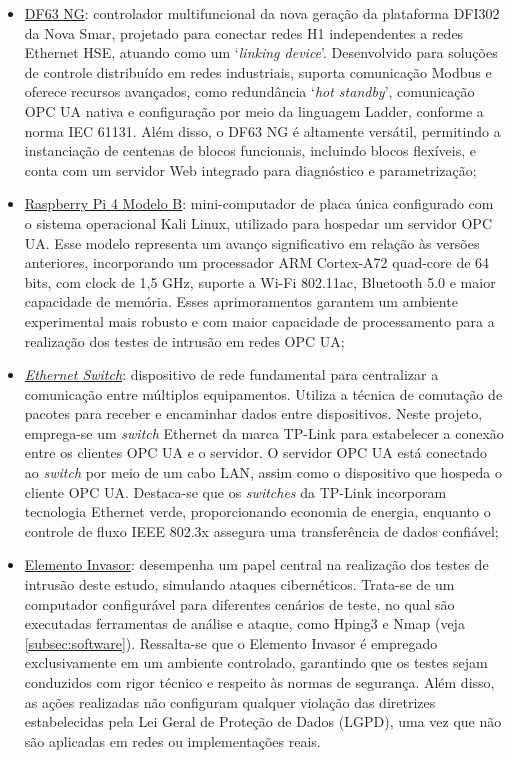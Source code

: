         \begin{itemize}
            \item \underline{DF63 NG}: controlador multifuncional da nova geração da plataforma DFI302 da Nova Smar, projetado para conectar redes H1 independentes a redes Ethernet HSE, atuando como um `\textit{linking device}'. Desenvolvido para soluções de controle distribuído em redes industriais, suporta comunicação Modbus e oferece recursos avançados, como redundância `\textit{hot standby}', comunicação OPC UA nativa e configuração por meio da linguagem Ladder, conforme a norma IEC 61131. Além disso, o DF63 NG é altamente versátil, permitindo a instanciação de centenas de blocos funcionais, incluindo blocos flexíveis, e conta com um servidor Web integrado para diagnóstico e parametrização;
            \item \underline{Raspberry Pi 4 Modelo B}: mini-computador de placa única configurado com o sistema operacional Kali Linux, utilizado para hospedar um servidor OPC UA. Esse modelo representa um avanço significativo em relação às versões anteriores, incorporando um processador ARM Cortex-A72 quad-core de 64 bits, com clock de 1,5 GHz, suporte a Wi-Fi 802.11ac, Bluetooth 5.0 e maior capacidade de memória. Esses aprimoramentos garantem um ambiente experimental mais robusto e com maior capacidade de processamento para a realização dos testes de intrusão em redes OPC UA;
            \item \underline{\textit{Ethernet Switch}}: dispositivo de rede fundamental para centralizar a comunicação entre múltiplos equipamentos. Utiliza a técnica de comutação de pacotes para receber e encaminhar dados entre dispositivos. Neste projeto, emprega-se um \textit{switch} Ethernet da marca TP-Link para estabelecer a conexão entre os clientes OPC UA e o servidor. O servidor OPC UA está conectado ao \textit{switch} por meio de um cabo LAN, assim como o dispositivo que hospeda o cliente OPC UA. Destaca-se que os \textit{switches} da TP-Link incorporam tecnologia Ethernet verde, proporcionando economia de energia, enquanto o controle de fluxo IEEE 802.3x assegura uma transferência de dados confiável;
            \item \underline{Elemento Invasor}: desempenha um papel central na realização dos testes de intrusão deste estudo, simulando ataques cibernéticos. Trata-se de um computador configurável para diferentes cenários de teste, no qual são executadas ferramentas de análise e ataque, como Hping3 e Nmap (veja \autoref{subsec:software}). Ressalta-se que o Elemento Invasor é empregado exclusivamente em um ambiente controlado, garantindo que os testes sejam conduzidos com rigor técnico e respeito às normas de segurança. Além disso, as ações realizadas não configuram qualquer violação das diretrizes estabelecidas pela Lei Geral de Proteção de Dados (LGPD), uma vez que não são aplicadas em redes ou implementações reais.
        \end{itemize}
    

